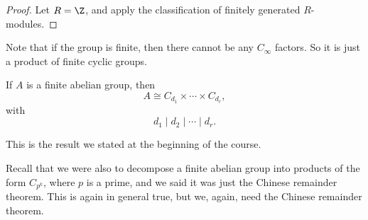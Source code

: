 \documentclass[a4paper]{article}
\begin{document}
\begin{proof}
  Let $R = \Z$, and apply the classification of finitely generated $R$-modules.
\end{proof}

Note that if the group is finite, then there cannot be any $C_\infty$ factors. So it is just a product of finite cyclic groups.
\begin{cor}
  If $A$ is a finite abelian group, then
  \[
    A \cong C_{d_1} \times \cdots \times C_{d_r},
  \]
  with
  \[
    d_1 \mid d_2 \mid \cdots \mid d_r.
  \]
\end{cor}
This is the result we stated at the beginning of the course.

Recall that we were also to decompose a finite abelian group into products of the form $C_{p^k}$, where $p$ is a prime, and we said it was just the Chinese remainder theorem. This is again in general true, but we, again, need the Chinese remainder theorem.
\end{document}
